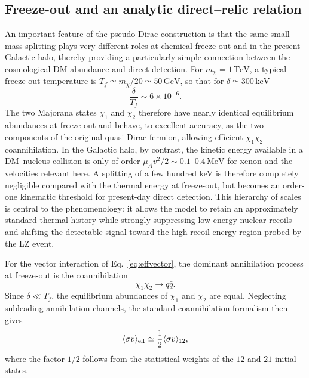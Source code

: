 \documentclass[aps,prd,reprint,superscriptaddress,nofootinbib,longbibliography,floatfix]{revtex4-2}
\newcommand{\GeV}{\mathrm{GeV}}
\newcommand{\TeV}{\mathrm{TeV}}
\newcommand{\keV}{\mathrm{keV}}
\begin{document}
\subsection{Freeze-out and an analytic direct--relic relation}

An important feature of the pseudo-Dirac construction is that the same small mass splitting plays very different roles at chemical freeze-out and in the present Galactic halo, thereby providing a particularly simple connection between the cosmological DM abundance and direct detection. For $m_\chi=1\,\TeV$, a typical freeze-out temperature is $T_f\simeq m_\chi/20\simeq50\,\GeV$, so that for $\delta\simeq300\,\keV$
\begin{equation}
\frac{\delta}{T_f}\sim6\times10^{-6}.
\end{equation}
The two Majorana states $\chi_1$ and $\chi_2$ therefore have nearly identical equilibrium abundances at freeze-out and behave, to excellent accuracy, as the two components of the original quasi-Dirac fermion, allowing efficient $\chi_1\chi_2$ coannihilation. In the Galactic halo, by contrast, the kinetic energy available in a DM--nucleus collision is only of order $\mu_A v^2/2\sim0.1$--$0.4\,\mathrm{MeV}$ for xenon and the velocities relevant here. A splitting of a few hundred keV is therefore completely negligible compared with the thermal energy at freeze-out, but becomes an order-one kinematic threshold for present-day direct detection. This hierarchy of scales is central to the phenomenology: it allows the model to retain an approximately standard thermal history while strongly suppressing low-energy nuclear recoils and shifting the detectable signal toward the high-recoil-energy region probed by the LZ event.

For the vector interaction of Eq.~\eqref{eq:effvector}, the dominant annihilation process at freeze-out is the coannihilation
\begin{equation}
\chi_1\chi_2\rightarrow q\bar q .
\end{equation}
Since $\delta\ll T_f$, the equilibrium abundances of $\chi_1$ and $\chi_2$ are equal. Neglecting subleading annihilation channels, the standard coannihilation formalism \cite{GriestSeckel1991} then gives
\begin{equation}
\langle\sigma v\rangle_{\rm eff}\simeq\frac{1}{2}\langle\sigma v\rangle_{12},
\end{equation}
where the factor $1/2$ follows from the statistical weights of the $12$ and $21$ initial states.
\end{document}
